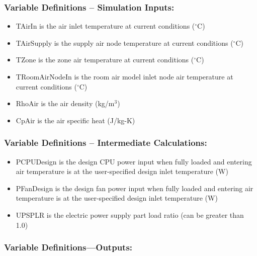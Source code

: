 \subsubsection{Variable Definitions -- Simulation Inputs:}\label{variable-definitions-simulation-inputs}

\begin{itemize}
\tightlist
\item
  TAirIn is the air inlet temperature at current conditions ($^\circ$C)
\item
  TAirSupply is the supply air node temperature at current conditions ($^\circ$C)
\item
  TZone is the zone air temperature at current conditions ($^\circ$C)
\item
  TRoomAirNodeIn is the room air model inlet node air temperature at current conditions ($^\circ$C)
\item
  RhoAir is the air density (kg/m$^3$)
\item
  CpAir is the air specific heat (J/kg-K)
\end{itemize}

\subsubsection{Variable Definitions -- Intermediate Calculations:}\label{variable-definitions-intermediate-calculations}

\begin{itemize}
\tightlist
\item
  PCPUDesign is the design CPU power input when fully loaded and entering air temperature is at the user-specified design inlet temperature (W)
\item
  PFanDesign is the design fan power input when fully loaded and entering air temperature is at the user-specified design inlet temperature (W)
\item
  UPSPLR is the electric power supply part load ratio (can be greater than 1.0)
\end{itemize}

\subsubsection{Variable Definitions---Outputs:}\label{variable-definitions-outputs}

